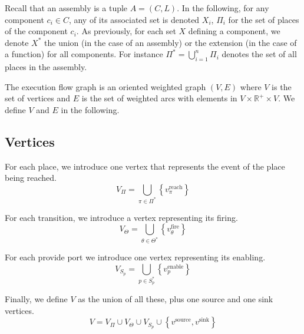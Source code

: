 Recall that an assembly is a tuple $A = (C,L)$. In the following, for
any component $c_i \in C$, any of its associated set is denoted
$X_i$, \eg $\Pi_i$ for the set of places of the component $c_i$.  As
previously, for each set $X$ defining a component, we denote $X^*$ the
union (in the case of an assembly) or the extension (in the case of a
function) for all components. For instance
$\Pi^*=\bigcup_{i=1}^{n}\Pi_i$ denotes the set of all places in the
assembly.

The execution flow graph is an oriented weighted graph $\left(V,E\right)$
where $V$ is the set of vertices and $E$ is the set of weighted
arcs with elements in $V\times \mathbb{R}^{+} \times V$. We define
$V$ and $E$ in the following.

\subsection{Vertices}

For each place, we introduce one vertex that represents the event of
the place being reached.
\[
V_{\Pi}=\bigcup_{\pi\in\Pi^*}\left\{ v_\pi^\text{reach}\right\} 
\]


For each transition, we introduce a vertex representing its firing.
\[
V_{\Theta}=\bigcup_{\theta\in\Theta^*}\left\{ v_\theta^\text{fire}\right\} 
\]


For each provide port we introduce one vertex representing its
enabling.
\[
V_{S_p}=\bigcup_{p\in S_p^*} \left\{ v_p^\text{enable}\right\} 
\]

Finally, we define $V$ as the union of all these, plus one source
and one sink vertices. 
\[
V=V_{\Pi}\cup V_{\Theta} \cup V_{S_p} \cup \left\{ v^\text{source},v^\text{sink}\right\} 
\]

